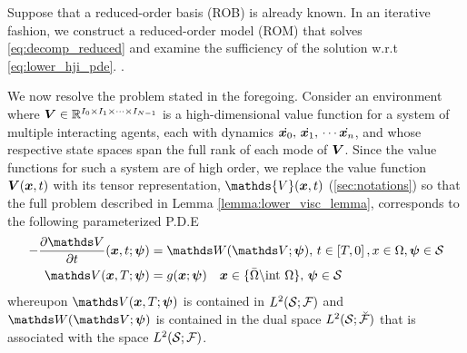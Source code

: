 \noindent   Suppose that a reduced-order basis (ROB) is already known. In an iterative fashion, we construct a reduced-order model (ROM) that solves \eqref{eq:decomp_reduced} and examine the sufficiency of the solution w.r.t \eqref{eq:lower_hji_pde}. .

We now resolve the problem stated in the foregoing. Consider an environment where $\bm{V} \in \mathbb{R}^{I_0 \times I_1 \times \cdots \times I_{N-1}}$ is a high-dimensional value function for a system  of multiple interacting agents, each with dynamics $\dot{\bm{x}_0}, \, \dot{\bm{x}_1}, \, \cdots \dot{\bm{x}_n}$, and whose respective state spaces span the full rank of each mode of $\bm{V}$. Since the value functions for such a system are of high order, we replace the value function $\bm{V}(\bm{x}, t)$ with its tensor representation,  $\mathds{V}(\state, t)$ (\cf \autoref{sec:notations}) so that  the full problem described in Lemma \ref{lemma:lower_visc_lemma}, corresponds to the following parameterized P.D.E 
%
\begin{subequations}
	\begin{align}
		 -\dfrac{\partial \valuetensor}{\partial t}(\state, t; \hilbertcoeff) &= \wtensor(\valuetensor; \hilbertcoeff), %
		  \, t \in \left[T, 0\right],  x \in \openset, \hilbertcoeff \in \mc{S}  \\
		\valuetensor(\state, T; \hilbertcoeff) &= g(\state; \hilbertcoeff) \quad \state \in  \{ \bar{\openset} \backslash \text{int } \openset\}, \,  \hilbertcoeff \in \mc{S}
		\label{eq:lower_visc_boundary_param}
	\end{align}
	\label{eq:lower_visc_param}
\end{subequations}
% 
whereupon $\valuetensor(\state, T; \hilbertcoeff)$ is contained in $L^2({\mathcal{S}}; \mathcal{F})$ and $\wtensor(\valuetensor; \hilbertcoeff)$ is contained in  the dual space $L^2({\mathcal{S}}; \breve{\mathcal{F}})$ that is associated with the space $L^2({\mathcal{S}}; \mathcal{F})$. 

